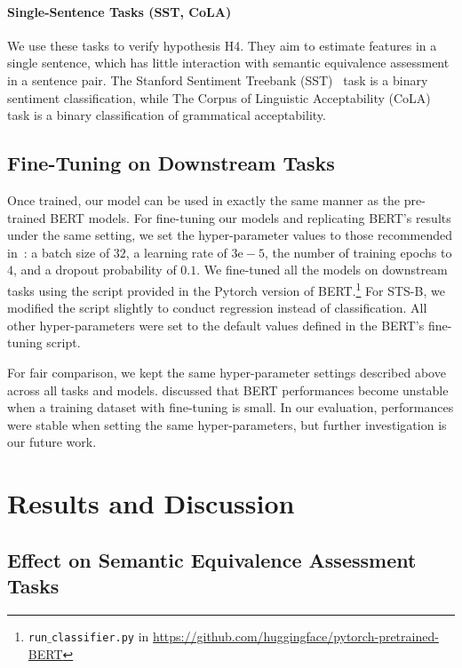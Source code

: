 \documentclass[11pt,a4paper]{article}
\begin{document}
\paragraph{Single-Sentence Tasks (SST, CoLA)}
We use these tasks to verify hypothesis H4. 
They aim to estimate features in a single sentence, which has little interaction with semantic equivalence assessment in a sentence pair.  
The Stanford Sentiment Treebank (SST)~\cite{socher-EtAl:2013:EMNLP} task is a binary sentiment classification, while The Corpus of Linguistic Acceptability (CoLA)~\cite{warstadt2018neural} task is a binary classification of grammatical acceptability.  

\subsection{Fine-Tuning on Downstream Tasks}
\label{sec:fine-tuning-setting}
Once trained, our model can be used in exactly the same manner as the pre-trained BERT models. 
For fine-tuning our models and replicating BERT's results under the same setting,  we set the hyper-parameter values to those recommended in~\cite{bert}: a batch size of $32$, a learning rate of $3\mathrm{e}-5$, the number of training epochs to $4$, and a dropout probability of $0.1$.
We fine-tuned all the models on downstream tasks using the script provided in the Pytorch version of BERT.\footnote{{\tt run$\_$classifier.py} in \url{https://github.com/huggingface/pytorch-pretrained-BERT}}
For STS-B, we modified the script slightly to conduct regression instead of classification. 
All other hyper-parameters were set to the default values defined in the BERT's fine-tuning script. 


For fair comparison, we kept the same hyper-parameter settings described above across all tasks and models. 
 discussed that BERT performances become unstable when a training dataset with fine-tuning is small. 
In our evaluation, performances were stable when setting the same hyper-parameters, but further investigation is our future work. 

\section{Results and Discussion}
\subsection{Effect on Semantic Equivalence Assessment Tasks}
\label{sec:overall_results}
\end{document}
